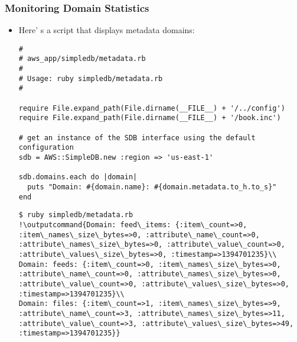 \documentclass{beamer}
\newcommand{\outputcommand}[1]{\color{darkgreen}{#1}}
\begin{document}
\begin{frame}
\frametitle{Monitoring Domain Statistics}
\begin{itemize}
\item Here’ s a script that displays metadata domains:

\lstset{language=Ruby, style=eclipse}
\begin{lstlisting}
#
# aws_app/simpledb/metadata.rb
#
# Usage: ruby simpledb/metadata.rb
#

require File.expand_path(File.dirname(__FILE__) + '/../config')
require File.expand_path(File.dirname(__FILE__) + '/book.inc')

# get an instance of the SDB interface using the default configuration
sdb = AWS::SimpleDB.new :region => 'us-east-1'

sdb.domains.each do |domain|
  puts "Domain: #{domain.name}: #{domain.metadata.to_h.to_s}"
end
\end{lstlisting}


\lstset{language=shell}
\begin{lstlisting}[escapechar=!]
$ ruby simpledb/metadata.rb
!\outputcommand{Domain: feed\_items: {:item\_count=>0, :item\_names\_size\_bytes=>0, :attribute\_name\_count=>0, :attribute\_names\_size\_bytes=>0, :attribute\_value\_count=>0, :attribute\_values\_size\_bytes=>0, :timestamp=>1394701235}\\
Domain: feeds: {:item\_count=>0, :item\_names\_size\_bytes=>0, :attribute\_name\_count=>0, :attribute\_names\_size\_bytes=>0, :attribute\_value\_count=>0, :attribute\_values\_size\_bytes=>0, :timestamp=>1394701235}\\
Domain: files: {:item\_count=>1, :item\_names\_size\_bytes=>9, :attribute\_name\_count=>3, :attribute\_names\_size\_bytes=>11, :attribute\_value\_count=>3, :attribute\_values\_size\_bytes=>49, :timestamp=>1394701235}}
\end{lstlisting}

\end{itemize}

\end{frame}

\end{document}

